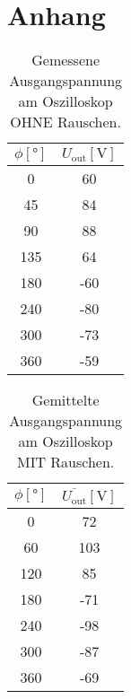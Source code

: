 \newpage
\section{Anhang}


\begin{table}
    \centering
    \caption{Gemessene Ausgangspannung am Oszilloskop OHNE Rauschen.}
    \label{tab:1}
    \begin{tabular}{c c}
        \toprule
        $\phi [\si{\degree}]$ & $U_{\text{out}} [\si{\volt}]$ \\
        \midrule
        0       & 60 \\
        45      & 84 \\
        90      & 88 \\
        135     & 64 \\
        180     & -60 \\
        240     & -80 \\
        300     & -73 \\
        360     & -59 \\
    \end{tabular}
\end{table}

\begin{table}
    \centering
    \caption{Gemittelte Ausgangspannung am Oszilloskop MIT Rauschen.}
    \label{tab:2}
    \begin{tabular}{c c}
        \toprule
        $\phi [\si{\degree}]$ & $\overline{U_{\text{out}}} [\si{\volt}]$ \\
        \midrule
        0      &  72    \\
        60     &  103   \\
        120    &  85    \\
        180    & -71    \\
        240    & -98    \\
        300    & -87    \\
        360    & -69    \\              
        \end{tabular}
\end{table}

